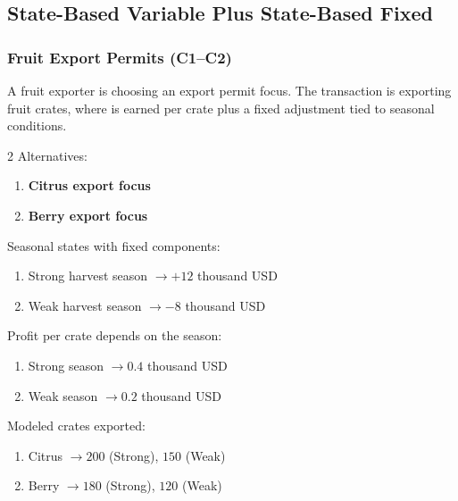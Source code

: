 
	\subsection{State-Based Variable Plus State-Based Fixed}
	\label{sec:state-based-variable-payoff-plus-state-based-fixed-payoff}


	\subsubsection{Fruit Export Permits (C1--C2)}
	\label{sec:problem22-fruit-export-permits-c1-c2}
	A fruit exporter is choosing an export permit focus. The transaction is exporting fruit crates, where  is earned per crate plus a fixed  adjustment tied to seasonal conditions.

	\begin{multicols}{2}
		Alternatives:
		\begin{enumerate}[label=\arabic*.]
			\item \textbf{Citrus export focus}
			\item \textbf{Berry export focus}
		\end{enumerate}

		Seasonal states with fixed  components:
		\begin{enumerate}[label=\arabic*.]
			\item Strong harvest season $\to +12$ thousand USD
			\item Weak harvest season $\to -8$ thousand USD
		\end{enumerate}

			\columnbreak

		Profit per crate depends on the season:
		\begin{enumerate}[label=\arabic*.]
			\item Strong season $\to 0.4$ thousand USD
			\item Weak season $\to 0.2$ thousand USD
		\end{enumerate}

		Modeled crates exported:
		\begin{enumerate}[label=\arabic*.]
			\item Citrus $\to 200$ (Strong), $150$ (Weak)
			\item Berry $\to 180$ (Strong), $120$ (Weak)
		\end{enumerate}
	\end{multicols}

